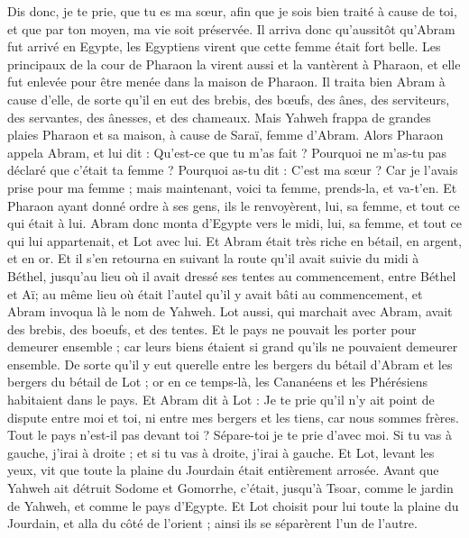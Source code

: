 \begin{multicols}{2}
Dis donc, je te prie, que tu es ma sœur, afin que je sois bien traité à cause de toi, et que par ton moyen, ma vie soit préservée.
Il arriva donc qu'aussitôt qu'Abram fut arrivé en Egypte, les Egyptiens virent que cette femme était fort belle.
Les principaux de la cour de Pharaon la virent aussi et la vantèrent à Pharaon, et elle fut enlevée pour être menée dans la maison de Pharaon.
Il traita bien Abram à cause d'elle, de sorte qu'il en eut des brebis, des bœufs, des ânes, des serviteurs, des servantes, des ânesses, et des chameaux.
Mais Yahweh frappa de grandes plaies Pharaon et sa maison, à cause de Saraï, femme d'Abram.
Alors Pharaon appela Abram, et lui dit : Qu'est-ce que tu m'as fait ? Pourquoi ne m'as-tu pas déclaré que c'était ta femme ?
Pourquoi as-tu dit : C'est ma sœur ? Car je l'avais prise pour ma femme ; mais maintenant, voici ta femme, prends-la, et va-t'en.
Et Pharaon ayant donné ordre à ses gens, ils le renvoyèrent, lui, sa femme, et tout ce qui était à lui.
\VerseOne{}Abram donc monta d'Egypte vers le midi, lui, sa femme, et tout ce qui lui appartenait, et Lot avec lui.
Et Abram était très riche en bétail, en argent, et en or.
Et il s'en retourna en suivant la route qu'il avait suivie du midi à Béthel, jusqu'au lieu où il avait dressé ses tentes au commencement, entre Béthel et Aï;
au même lieu où était l'autel qu'il y avait bâti au commencement, et Abram invoqua là le nom de Yahweh.
Lot aussi, qui marchait avec Abram, avait des brebis, des boeufs, et des tentes.
Et le pays ne pouvait les porter pour demeurer ensemble ; car leurs biens étaient si grand qu'ils ne pouvaient demeurer ensemble.
De sorte qu'il y eut querelle entre les bergers du bétail d'Abram et les bergers du bétail de Lot ; or en ce temps-là, les Cananéens et les Phérésiens habitaient dans le pays.
Et Abram dit à Lot : Je te prie qu'il n'y ait point de dispute entre moi et toi, ni entre mes bergers et les tiens, car nous sommes frères.
Tout le pays n'est-il pas devant toi ? Sépare-toi je te prie d'avec moi. Si tu vas à gauche, j'irai à droite ; et si tu vas à droite, j'irai à gauche.
Et Lot, levant les yeux, vit que toute la plaine du Jourdain était entièrement arrosée. Avant que Yahweh ait détruit Sodome et Gomorrhe, c'était, jusqu'à Tsoar, comme le jardin de Yahweh, et comme le pays d'Egypte.
Et Lot choisit pour lui toute la plaine du Jourdain, et alla du côté de l'orient ; ainsi ils se séparèrent l'un de l'autre.

\end{multicols}
